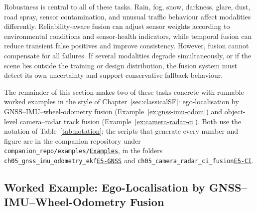 \documentclass[graybox,envcountchap]{style/SNmono}
\newcommand{\repopath}[1]{\texttt{#1}}
\providecommand{\DIFadd}[1]{{\protect\color{blue} #1}} %
\providecommand{\DIFdel}[1]{{\protect\color{red} #1}} %
\DeclareRobustCommand{\RtwoDel}[1]{{\color{red}%
  \renewcommand{\DIFadd}[1]{##1}\renewcommand{\DIFdel}[1]{##1}%
  #1}}
\DeclareRobustCommand{\RtwoAdd}[1]{{\color{blue}#1}}
\DeclareRobustCommand{\codeentry}[1]{\hyperref[code:#1]{\texttt{#1}}}
\begin{document}
Robustness is central to all of these tasks. Rain, fog, snow, darkness, glare, dust, road spray, sensor contamination, and unusual traffic behaviour affect modalities differently. Reliability-aware fusion can adjust sensor weights according to environmental conditions and sensor-health indicators, while temporal fusion can reduce transient false positives and improve consistency. However, fusion cannot compensate for all failures. If several modalities degrade simultaneously, or if the scene lies outside the training or design distribution, the fusion system must detect its own uncertainty and support conservative fallback behaviour.

The remainder of this section makes two of these tasks concrete with runnable worked examples in the style of Chapter~\ref{sec:classicalSF}: ego-localisation by GNSS--IMU--wheel-odometry fusion (Example~\ref{ex:gnss-imu-odom}) and object-level camera--radar track fusion (Example~\ref{ex:camera-radar-ci}). Both use the notation of Table~\ref{tab:notation}; the scripts that generate every number and figure are in the companion repository under \RtwoDel{\repopath{companion\_\allowbreak repo/\allowbreak examples/\allowbreak }}\RtwoAdd{\codeentry{Examples}}, in the folders \RtwoDel{\repopath{ch05\_\allowbreak gnss\_\allowbreak imu\_\allowbreak odometry\_\allowbreak ekf}}\RtwoAdd{\codeentry{E5-GNSS}} and \RtwoDel{\repopath{ch05\_\allowbreak camera\_\allowbreak radar\_\allowbreak ci\_\allowbreak fusion}}\RtwoAdd{\codeentry{E5-CI}}.

\subsection{Worked Example: Ego-Localisation by GNSS--IMU--Wheel-Odometry Fusion}
\label{subsec:ex-gnss}
\end{document}
